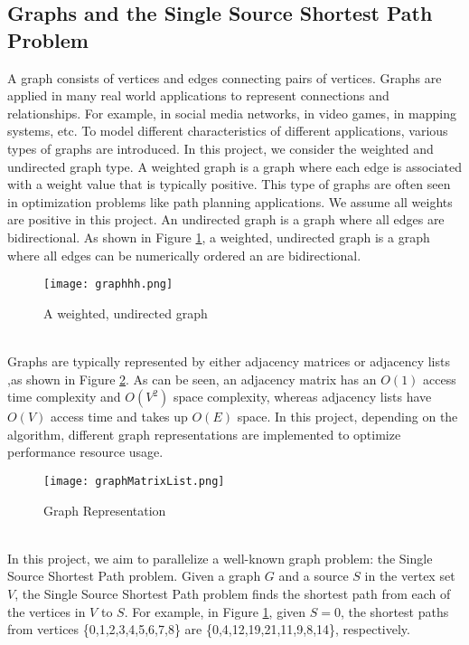 \documentclass[12pt]{article}
\begin{document}
\subsection{Graphs and the Single Source Shortest Path Problem}
A graph consists of vertices and edges connecting pairs of vertices. Graphs are applied in many real world applications to represent connections and relationships. For example, in social media networks, in video games, in mapping systems, etc. To model different characteristics of different applications, various types of graphs are introduced. In this project, we consider the weighted and undirected graph type. A weighted graph is a graph where each edge is associated with a weight value that is typically positive. This type of graphs are often seen in optimization problems like path planning applications. We assume all weights are positive in this project. An undirected graph is a graph where all edges are bidirectional. As shown in Figure \ref{fig:wug}, a weighted, undirected graph is a graph where all edges can be numerically ordered an are bidirectional.\\ 
\begin{figure}[h!]
\begin{center}
  \texttt{[image: graphhh.png]}
  \caption{A weighted, undirected graph \cite{geeksforgeeks}}
  \label{fig:wug}
  \end{center}
\end{figure} 
\\Graphs are typically represented by either adjacency matrices or adjacency lists ,as shown in Figure \ref{fig:gr}. As can be seen, an adjacency matrix has an $O(1)$ access time complexity and $O(V^2)$ space complexity, whereas adjacency lists have $O(V)$ access time and takes up $O(E)$ space. In this project, depending on the algorithm, different graph representations are implemented to optimize performance resource usage.\\
\begin{figure}[h!]
\begin{center}
  \texttt{[image: graphMatrixList.png]}
  \caption{Graph Representation \cite{bournetocode}}
  \label{fig:gr}
  \end{center}
\end{figure} 
\\In this project, we aim to parallelize a well-known graph problem: the Single Source Shortest Path problem. Given a graph $G$ and a source $S$ in the vertex set $V$, the Single Source Shortest Path problem finds the shortest path from each of the vertices in $V$ to $S$. For example, in Figure \ref{fig:wug}, given $S=0$, the shortest paths from vertices \{0,1,2,3,4,5,6,7,8\} are \{0,4,12,19,21,11,9,8,14\}, respectively. 
\end{document}
